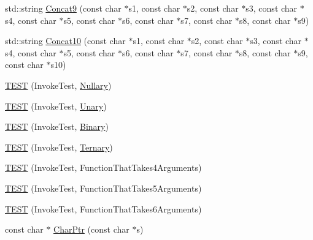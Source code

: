 \begin{DoxyCompactItemize}
\item 
std\+::string \mbox{\hyperlink{namespacetesting_1_1gmock__more__actions__test_a302f1938b41c2ce503a7628aa45cd017}{Concat9}} (const char $\ast$s1, const char $\ast$s2, const char $\ast$s3, const char $\ast$s4, const char $\ast$s5, const char $\ast$s6, const char $\ast$s7, const char $\ast$s8, const char $\ast$s9)
\item 
std\+::string \mbox{\hyperlink{namespacetesting_1_1gmock__more__actions__test_a4a2fcb45125cd238e4146a4b0c568414}{Concat10}} (const char $\ast$s1, const char $\ast$s2, const char $\ast$s3, const char $\ast$s4, const char $\ast$s5, const char $\ast$s6, const char $\ast$s7, const char $\ast$s8, const char $\ast$s9, const char $\ast$s10)
\item 
\mbox{\hyperlink{namespacetesting_1_1gmock__more__actions__test_a9c5fbd26c6cc6ed31aed5bafb2fa8e5c}{T\+E\+ST}} (Invoke\+Test, \mbox{\hyperlink{namespacetesting_1_1gmock__more__actions__test_acdd2dd80f777fdb770b513b63064ac19}{Nullary}})
\item 
\mbox{\hyperlink{namespacetesting_1_1gmock__more__actions__test_a28b57a9f9d38574b7c033988ad528ddd}{T\+E\+ST}} (Invoke\+Test, \mbox{\hyperlink{namespacetesting_1_1gmock__more__actions__test_aad456ea2ee1b0cb2741b676a34f540a3}{Unary}})
\item 
\mbox{\hyperlink{namespacetesting_1_1gmock__more__actions__test_a906bd5cc7aa38e2cc861a9732481fce7}{T\+E\+ST}} (Invoke\+Test, \mbox{\hyperlink{namespacetesting_1_1gmock__more__actions__test_a853c9f048674a60798b930750b74a1df}{Binary}})
\item 
\mbox{\hyperlink{namespacetesting_1_1gmock__more__actions__test_a424fb6113c6c1ab2157edf854a4ae9fe}{T\+E\+ST}} (Invoke\+Test, \mbox{\hyperlink{namespacetesting_1_1gmock__more__actions__test_ab98b352528a0b72625b4710a6fc648a1}{Ternary}})
\item 
\mbox{\hyperlink{namespacetesting_1_1gmock__more__actions__test_a17f41c1f7f180371d4d240089cdff0dd}{T\+E\+ST}} (Invoke\+Test, Function\+That\+Takes4\+Arguments)
\item 
\mbox{\hyperlink{namespacetesting_1_1gmock__more__actions__test_a3b6b1b682295a1d04d57374445359e94}{T\+E\+ST}} (Invoke\+Test, Function\+That\+Takes5\+Arguments)
\item 
\mbox{\hyperlink{namespacetesting_1_1gmock__more__actions__test_a9a6c89b83ba253838d05d7ee5da7d954}{T\+E\+ST}} (Invoke\+Test, Function\+That\+Takes6\+Arguments)
\item 
const char $\ast$ \mbox{\hyperlink{namespacetesting_1_1gmock__more__actions__test_aa19ac39aaa785adeb8d7837d58b824f3}{Char\+Ptr}} (const char $\ast$s)

\end{DoxyCompactItemize}
